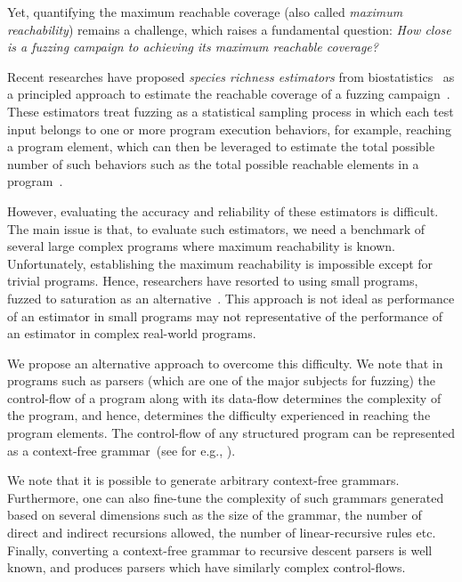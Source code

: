 \documentclass[conference]{IEEEtran}
\begin{document}
Yet, quantifying the maximum reachable coverage (also called \emph{maximum reachability})
remains a challenge, which raises a fundamental question:
\emph{How close is a fuzzing campaign to achieving its maximum reachable coverage?}

Recent researches have proposed \emph{species richness estimators} from
biostatistics~\cite{chao2016species} as a principled approach to estimate
the reachable coverage of a fuzzing campaign~\cite{boehme2018stads}.
These estimators treat fuzzing as a statistical sampling process in which
each test input belongs to one or more program execution behaviors,
for example, reaching a program element, which can then be leveraged to
estimate the total possible number of such behaviors such as the total
possible reachable elements in a program~\cite{boehme2018stads}.


However, evaluating the accuracy and reliability
of these estimators is difficult. The main issue is that, to evaluate such
estimators, we need a benchmark of several large complex programs where
maximum reachability is known. Unfortunately, establishing the maximum
reachability is impossible except for trivial programs. Hence, researchers have resorted to using small programs, fuzzed to saturation as an alternative~\cite{liyanage2023reachable}.
This approach is not ideal as performance of an estimator in small
programs may not representative of the performance of an estimator in complex
real-world programs.

We propose an alternative approach to overcome this difficulty. We note that
in programs such as parsers (which are one of the major subjects for fuzzing)
the control-flow of a program along with its data-flow determines the
complexity of the program, and hence, determines the difficulty
experienced in reaching the program elements. The control-flow of any
structured program can be represented as a context-free
grammar~(see for e.g., ).

We note that it is possible to generate arbitrary
context-free grammars. Furthermore, one can also fine-tune the complexity
of such grammars generated based on several dimensions such as the size
of the grammar, the number of direct and indirect recursions allowed, the
number of linear-recursive rules etc.
Finally, converting a context-free grammar to recursive descent
parsers is well known, and produces parsers which have similarly complex
control-flows.
\end{document}

